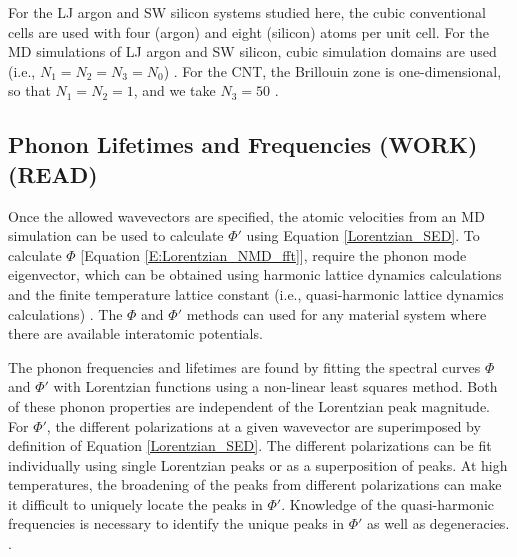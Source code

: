 For the LJ argon and SW silicon systems studied here, the cubic 
conventional cells are 
used with four (argon) and eight (silicon) atoms per unit cell. For the 
MD simulations of
 LJ argon and SW silicon, cubic simulation domains are used (i.e., 
 $N_1 = N_2 = N_3 = N_0$) 
\cite{mcgaughey_quantitative_2004,turney_predicting_2009,
sellan_size_2010}. For the CNT, the Brillouin 
zone is one-dimensional, 
so that $N_1 = N_2 = 1$, and we take $N_3=50$ 
\cite{thomas_predicting_2010}.


\subsection{\label{Subsection_Comp_Details_2}Phonon Lifetimes and 
Frequencies (WORK) (READ)}
Once the allowed wavevectors are specified, the atomic velocities from 
an MD simulation can be used to calculate $\Phi'$ using Equation 
\eqref{Lorentzian_SED}. To calculate $\Phi$ 
[Equation \eqref{E:Lorentzian_NMD_fft}], 
require the phonon mode eigenvector, which can be obtained using 
harmonic lattice dynamics calculations and the finite temperature 
lattice constant (i.e., quasi-harmonic lattice dynamics calculations) 
\cite{dove_introduction_1993,gale_general_2003}. 
The $\Phi$ and $\Phi'$ methods can used 
for any material system where there are 
available interatomic potentials.

The phonon frequencies and lifetimes are found by fitting the spectral 
curves $\Phi$ and $\Phi'$ with Lorentzian functions using a non-linear 
least squares method. Both of these 
phonon properties are independent of the Lorentzian peak magnitude. 
For $\Phi'$, the different polarizations at a given wavevector are 
superimposed by definition of Equation \eqref{Lorentzian_SED}. 
The different polarizations can be fit individually using single 
Lorentzian peaks or as a superposition of peaks. At high temperatures, 
the broadening of the peaks from different polarizations can make it 
difficult to uniquely locate the peaks in $\Phi'$. Knowledge of the 
quasi-harmonic frequencies is necessary to identify the unique peaks in 
$\Phi'$ as well as degeneracies.
\cite{mcgaughey_phonon_2006,turney_predicting_2009}.

